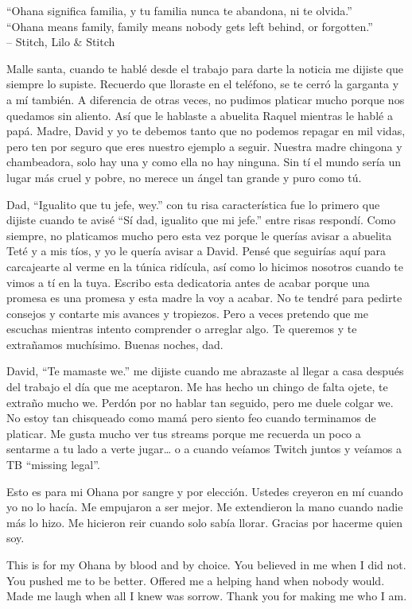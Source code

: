 \begin{frontmatter}[Dedication]
    \centering
    ``Ohana significa familia, y tu familia nunca te abandona, ni te olvida.''\\
    ``Ohana means family, family means nobody gets left behind, or forgotten.''\\
    -- Stitch, Lilo \& Stitch

    \justify
    Malle santa, cuando te hablé desde el trabajo para darte la noticia me dijiste que siempre lo supiste. Recuerdo que lloraste en el teléfono, se te cerró la garganta y a mí también. A diferencia de otras veces, no pudimos platicar mucho porque nos quedamos sin aliento. Así que le hablaste a abuelita Raquel mientras le hablé a papá. Madre, David y yo te debemos tanto que no podemos repagar en mil vidas, pero ten por seguro que eres nuestro ejemplo a seguir. Nuestra madre chingona y chambeadora, solo hay una y como ella no hay ninguna. Sin tí el mundo sería un lugar más cruel y pobre, no merece un ángel tan grande y puro como tú.

    Dad, ``Igualito que tu jefe, wey.'' con tu risa característica fue lo primero que dijiste cuando te avisé ``Sí dad, igualito que mi jefe.'' entre risas respondí. Como siempre, no platicamos mucho pero esta vez porque le querías avisar a abuelita Teté y a mis tíos, y yo le quería avisar a David. Pensé que seguirías aquí para carcajearte al verme en la túnica ridícula, así como lo hicimos nosotros cuando te vimos a tí en la tuya. Escribo esta dedicatoria antes de acabar porque una promesa es una promesa y esta madre la voy a acabar. No te tendré para pedirte consejos y contarte mis avances y tropiezos. Pero a veces pretendo que me escuchas mientras intento comprender o arreglar algo. Te queremos y te extrañamos muchísimo. Buenas noches, dad.

    David, ``Te mamaste we.'' me dijiste cuando me abrazaste al llegar a casa después del trabajo el día que me aceptaron. Me has hecho un chingo de falta ojete, te extraño mucho we. Perdón por no hablar tan seguido, pero me duele colgar we. No estoy tan chisqueado como mamá pero siento feo cuando terminamos de platicar. Me gusta mucho ver tus streams porque me recuerda un poco a sentarme a tu lado a verte jugar\ldots{} o a cuando veíamos Twitch juntos y veíamos a TB ``missing legal''.

    Esto es para mi Ohana por sangre y por elección. Ustedes creyeron en mí cuando yo no lo hacía. Me empujaron a ser mejor. Me extendieron la mano cuando nadie más lo hizo. Me hicieron reir cuando solo sabía llorar. Gracias por hacerme quien soy.

    This is for my Ohana by blood and by choice. You believed in me when I did not. You pushed me to be better. Offered me a helping hand when nobody would. Made me laugh when all I knew was sorrow. Thank you for making me who I am.
\end{frontmatter}

